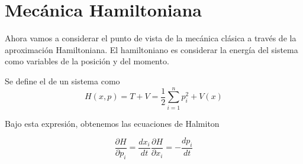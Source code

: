 \chapter{Mecánica Hamiltoniana}

Ahora vamos a considerar el punto de vista de la mecánica clásica a través de la aproximación Hamiltoniana.
El hamiltoniano es considerar la energía del sistema como variables de la posición y del momento.

\begin{definition}[Hamiltoniano]
    Se define el  de un sistema como
    \begin{equation}
        \label{hamiltoniano}
        H(x,p)=T+V=\frac{1}{2}\sum_{i=1}^{n} p_i^2 +V(x)
    \end{equation}

\end{definition}

Bajo esta expresión, obtenemos las ecuaciones de Halmiton
\begin{postulate}
    \begin{subequations}
        \begin{equation}\label{eq:halmiton_parcial_momento}
            \frac{\partial H}{\partial p_i}=\frac{d x_i}{dt}
        \end{equation}
        \begin{equation}\label{eq:halmiton_parcial_posicion}
            \frac{\partial H}{\partial x_i}=-\frac{d p_i}{dt}
        \end{equation}
    \end{subequations}
\end{postulate}
